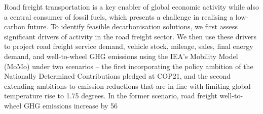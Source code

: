 Road freight transportation is a key enabler of global economic activity while also a central consumer of fossil fuels, which presents a challenge in realising a low-carbon future. To identify feasible decarbonisation solutions, we first assess significant drivers of activity in the road freight sector. We then use these drivers to project road freight service demand, vehicle stock, mileage, sales, final energy demand, and well-to-wheel GHG emissions using the IEA’s Mobility Model (MoMo) under two scenarios – the first incorporating the policy ambition of the Nationally Determined Contributions pledged at COP21, and the second extending ambitions to emission reductions that are in line with limiting global temperature rise to 1.75 degrees. In the former scenario, road freight well-to-wheel GHG emissions increase by 56%